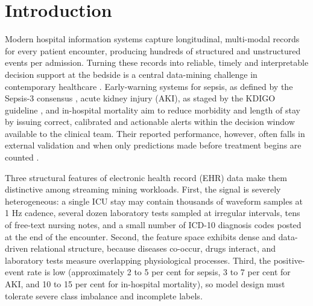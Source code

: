 \documentclass[conference]{IEEEtran}
\begin{document}
\section{Introduction}
Modern hospital information systems capture longitudinal, multi-modal records for every patient encounter, producing hundreds of structured and unstructured events per admission. Turning these records into reliable, timely and interpretable decision support at the bedside is a central data-mining challenge in contemporary healthcare \cite{jensen2012,miotto2018}. Early-warning systems for sepsis, as defined by the Sepsis-3 consensus \cite{singer2016}, acute kidney injury (AKI), as staged by the KDIGO guideline \cite{kdigo2012}, and in-hospital mortality \cite{johnson2017mlhc} aim to reduce morbidity and length of stay by issuing correct, calibrated and actionable alerts within the decision window available to the clinical team. Their reported performance, however, often falls in external validation \cite{wong2021} and when only predictions made before treatment begins are counted \cite{kamran2024}.

Three structural features of electronic health record (EHR) data make them distinctive among streaming mining workloads. First, the signal is severely heterogeneous: a single ICU stay may contain thousands of waveform samples at 1 Hz cadence, several dozen laboratory tests sampled at irregular intervals, tens of free-text nursing notes, and a small number of ICD-10 diagnosis codes posted at the end of the encounter. Second, the feature space exhibits dense and data-driven relational structure, because diseases co-occur, drugs interact, and laboratory tests measure overlapping physiological processes. Third, the positive-event rate is low (approximately 2 to 5 per cent for sepsis, 3 to 7 per cent for AKI, and 10 to 15 per cent for in-hospital mortality), so model design must tolerate severe class imbalance and incomplete labels.
\end{document}
